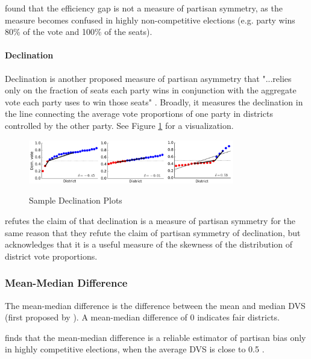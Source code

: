 \textcite{veomett2018} found that the efficiency gap is not a measure of partisan symmetry, as the measure becomes confused in highly non-competitive elections (e.g. party wins 80\% of the vote and 100\% of the seats). 

\paragraph{Declination}
\label{sec:declination}

Declination is another proposed measure of partisan asymmetry that "...relies only on the fraction of seats each party wins in conjunction with the aggregate vote each party uses to win those seats" \parencite[3]{warrington2018}. Broadly, it measures the declination in the line connecting the average vote proportions of one party in districts controlled by the other party. See Figure \ref{fig:dec} for a visualization. 

\begin{figure}[h]
    \caption{Sample Declination Plots}
    \includegraphics[width=0.8\textwidth]{img/dec.PNG}
    \label{fig:dec}
    \raggedright
\end{figure}

\textcite{katz2020} refutes the claim of \textcite{warrington2018} that declination is a measure of partisan symmetry for the same reason that they refute the claim of partisan symmetry of declination, but acknowledges that it is a useful measure of the skewness of the distribution of district vote proportions. 

\subsubsection{Mean-Median Difference}
\label{sec:meanmed}

The mean-median difference is the difference between the mean and median DVS (first proposed by \textcite{mcdonald2015}). A mean-median difference of 0 indicates fair districts. 

\textcite{katz2020} finds that the mean-median difference is a reliable estimator of partisan bias only in highly competitive elections, when the average DVS is close to 0.5 \parencite[27-9]{katz2020}.